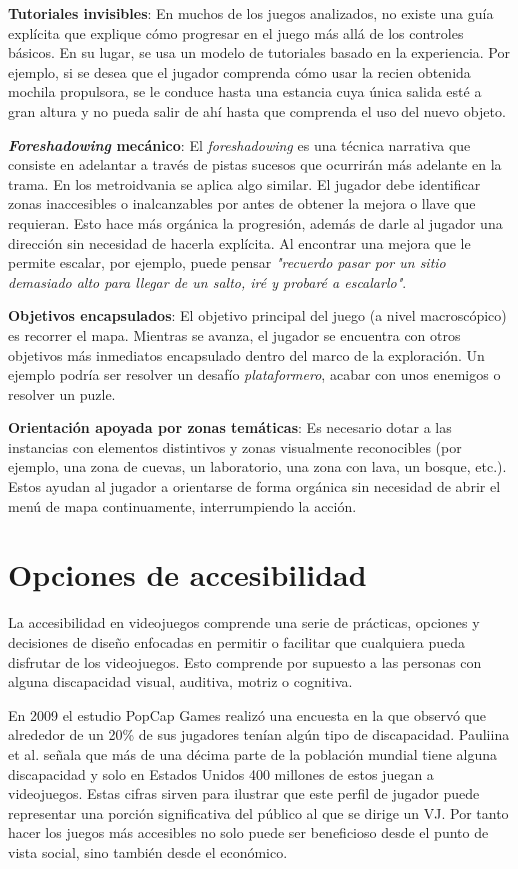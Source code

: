 \textbf{Tutoriales invisibles}: En muchos de los juegos analizados, no existe una guía explícita que explique cómo progresar en el juego más allá de los controles básicos. En su lugar, se usa un modelo de tutoriales basado en la experiencia. Por ejemplo, si se desea que el jugador comprenda cómo usar la recien obtenida mochila propulsora, se le conduce hasta una estancia cuya única salida esté a gran altura y no pueda salir de ahí hasta que comprenda el uso del nuevo objeto.


\textbf{\textit{Foreshadowing} mecánico}: El \textit{foreshadowing} es una técnica narrativa que consiste en adelantar a través de pistas sucesos que ocurrirán más adelante en la trama. En los metroidvania se aplica algo similar. El jugador debe identificar zonas inaccesibles o inalcanzables por antes de obtener la mejora o llave que requieran. Esto hace más orgánica la progresión, además de darle al jugador una dirección sin necesidad de hacerla explícita. Al encontrar una mejora que le permite escalar, por ejemplo, puede pensar \textit{"recuerdo pasar por un sitio demasiado alto para llegar de un salto, iré y probaré a escalarlo"}.


\textbf{Objetivos encapsulados}: El objetivo principal del juego (a nivel macroscópico) es recorrer el mapa. Mientras se avanza, el jugador se encuentra con otros objetivos más inmediatos encapsulado dentro del marco de la exploración. Un ejemplo podría ser resolver un desafío \textit{plataformero}, acabar con unos enemigos o resolver un puzle. 


\textbf{Orientación apoyada por zonas temáticas}: Es necesario dotar a las instancias con elementos distintivos y zonas visualmente reconocibles (por ejemplo, una zona de cuevas, un laboratorio, una zona con lava, un bosque, etc.). Estos ayudan al jugador a orientarse de forma orgánica sin necesidad de abrir el menú de mapa continuamente, interrumpiendo la acción.

\section{Opciones de accesibilidad}

La accesibilidad en videojuegos comprende una serie de prácticas, opciones y decisiones de diseño enfocadas en permitir o facilitar que cualquiera pueda disfrutar de los videojuegos. Esto comprende por supuesto a las personas con alguna discapacidad visual, auditiva, motriz o cognitiva.

En 2009 el estudio PopCap Games realizó una encuesta en la que observó que alrededor de un 20\% de sus jugadores tenían algún tipo de discapacidad\cite{popcap}. Pauliina et al.\cite{paulina} señala que más de una décima parte de la población mundial tiene alguna discapacidad y solo en Estados Unidos 400 millones de estos juegan a videojuegos. Estas cifras sirven para ilustrar que este perfil de jugador puede representar una porción significativa del público al que se dirige un VJ. Por tanto hacer los juegos más accesibles no solo puede ser beneficioso desde el punto de vista social, sino también desde el económico.

